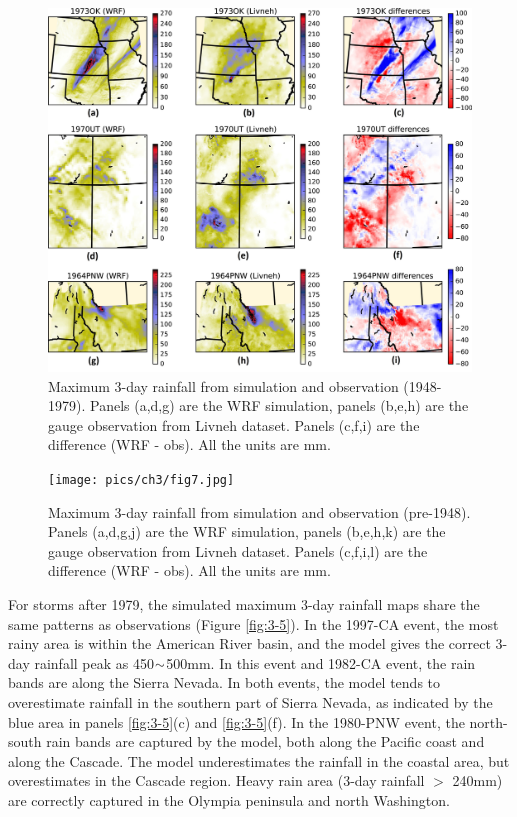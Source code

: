 \begin{figure}[htbp]
	\includegraphics[width=\linewidth]{pics/ch3/fig6.jpg}
	\caption{Maximum 3-day rainfall from simulation and observation (1948-1979). Panels (a,d,g) are the WRF simulation, panels (b,e,h) are the gauge observation from Livneh dataset. Panels (c,f,i) are the difference (WRF - obs). All the units are mm.}
	\label{fig:3-6}
\end{figure}

\begin{figure}[htbp]
	\texttt{[image: pics/ch3/fig7.jpg]}
	\caption{Maximum 3-day rainfall from simulation and observation (pre-1948). Panels (a,d,g,j) are the WRF simulation, panels (b,e,h,k) are the gauge observation from Livneh dataset. Panels (c,f,i,l) are the difference (WRF - obs). All the units are mm.}
	\label{fig:3-7}
\end{figure}

For storms after 1979, the simulated maximum 3-day rainfall maps share the same patterns as observations (Figure \ref{fig:3-5}). In the 1997-CA event, the most rainy area is within the American River basin, and the model gives the correct 3-day rainfall peak as 450$\scriptsize{\sim}$500mm. In this event and 1982-CA event, the rain bands are along the Sierra Nevada. In both events, the model tends to overestimate rainfall in the southern part of Sierra Nevada, as indicated by the blue area in panels \ref{fig:3-5}(c) and \ref{fig:3-5}(f). In the 1980-PNW event, the north-south rain bands are captured by the model, both along the Pacific coast and along the Cascade. The model underestimates the rainfall in the coastal area, but overestimates in the Cascade region. Heavy rain area (3-day rainfall $>$ 240mm) are correctly captured in the Olympia peninsula and north Washington.

